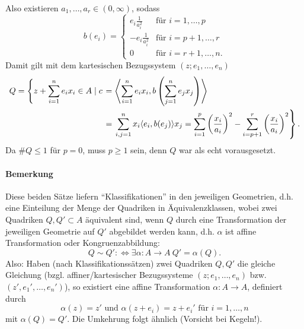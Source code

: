 	Also existieren $ a_1,\dots,a_r\in (0,\infty) $, sodass
		\[ b(e_i)=\begin{cases}
			e_i\frac{1}{a_i^2} &\text{für } i = 1,\dots,p\\
			-e_i\frac{1}{a_i^2} &\text{für } i = p+1,\dots,r\\
			0 & \text{für } i = r+1,\dots,n.
		\end{cases} \]
	Damit gilt mit dem kartesischen Bezugssystem $ (z;e_1,\dots,e_n) $
		\begin{align*}
		Q=\left\{z+\sum_{i=1}^{n}e_ix_i\in A\mid c\right.&=\left\langle{\sum_{i=1}^{n}e_ix_i},{b\left(\sum_{j=1}^{n}e_jx_j\right)}\right\rangle \\
		 &= \left.\sum_{i,j=1}^{n}x_i\langle e_i,b(e_j) \rangle x_j = \sum_{i=1}^{p}\left(\frac{x_i}{a_i}\right)^2-\sum_{i=p+1}^{r}\left(\frac{x_i}{a_i}\right)^2 \right\}.
		\end{align*}
	Da $ \#Q \leq 1 $ für $ p=0 $, muss $ p\geq 1 $ sein, denn $ Q $ war als echt vorausgesetzt.
\paragraph{Bemerkung}
	Diese beiden Sätze liefern "`Klassifikationen"' in den jeweiligen Geometrien, d.h. eine Einteilung der Menge der Quadriken in Äquivalenzklassen, wobei zwei Quadriken $ Q,Q'\subset A $ äquivalent sind, wenn $ Q $ durch eine Transformation der jeweiligen Geometrie auf $ Q' $ abgebildet werden kann, d.h. $ \alpha $ ist affine Transformation oder Kongruenzabbildung:
		\[ Q\sim Q' :\Leftrightarrow \exists \alpha:A\to A\: Q' = \alpha(Q). \]
	Also: Haben (nach Klassifikationssätzen) zwei Quadriken $ Q,Q'$ die gleiche Gleichung (bzgl. affiner/kartesischer Bezugssysteme $ (z;e_1,\dots,e_n) $ bzw. $ (z',e_1',\dots,e_n') $), so existiert eine affine Transformation $ \alpha:A\to A $, definiert durch
		\[  \alpha(z) = z' \text{ und } \alpha(z+e_i) = z+e_i' \text{ für } i=1,\dots,n \]
	mit $ \alpha(Q) = Q' $. Die Umkehrung folgt ähnlich (Vorsicht bei Kegeln!).
